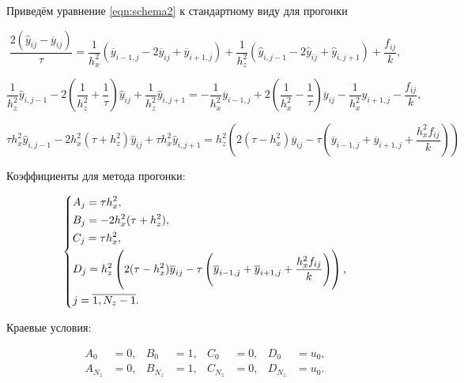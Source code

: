 \documentclass[12pt, a4paper]{article}
\begin{document}
Приведём уравнение \eqref{eqn:schema2} к стандартному виду для прогонки

\begin{equation}
	\frac{2(\hat y_{ij} - \overline y_{ij})}{\tau} = \frac{1}{h_x^2} (\overline y_{i - 1, j} - 2\overline y_{ij} + \overline y_{i + 1, j}) + \frac{1}{h_z^2} (\hat y_{i, j - 1} - 2\hat y_{ij} + \hat y_{i, j + 1}) + \frac{f_{ij}}k,
\end{equation}

\begin{equation}
	\frac1{h_z^2} \hat y_{i, j - 1} - 2 \left(\frac1{h_z^2} + \frac1\tau \right)\hat y_{ij} + \frac1{h_z^2}\hat y_{i, j + 1}
	= -\frac1{h_x^2}\overline y_{i - 1, j} + 2\left(\frac1{h_x^2} - \frac1\tau\right)\overline y_{ij} - \frac1{h_x^2}y_{i + 1, j} - \frac{f_{ij}}k,
\end{equation}

\begin{equation}
	\tau h_x^2 \hat y_{i, j - 1} - 2h_x^2(\tau + h_z^2)\hat y_{ij} + \tau h_x^2 \hat y_{i, j + 1}
	= h_z^2 \left( 2(\tau - h_x^2)\overline y_{ij} - \tau \left( \overline y_{i - 1, j} + \overline y_{i + 1, j} + \frac{h_x^2 f_{ij}}k \right) \right)
\end{equation}

Коэффициенты для метода прогонки:

\begin{equation}
	\begin{dcases}
		A_j = \tau h_x^2, \\
		B_j = -2h_x^2(\tau + h_z^2), \\
		C_j = \tau h_x^2, \\
		D_j = h_z^2 \left( 2(\tau - h_x^2)\overline y_{ij} - \tau \left( \overline y_{i - 1, j} + \overline y_{i + 1, j} + \frac{h_x^2 f_{ij}}k \right) \right), \\
		j = \overline{1, N_z - 1}. \\
	\end{dcases}
\end{equation}

Краевые условия:

\begin{equation}
	\begin{aligned}
		A_0     &= 0, & B_0     &= 1, & C_0     &= 0, & D_0     &= u_0, \\
		A_{N_z} &= 0, & B_{N_z} &= 1, & C_{N_z} &= 0, & D_{N_z} &= u_0. \\
	\end{aligned}
\end{equation}
\end{document}
